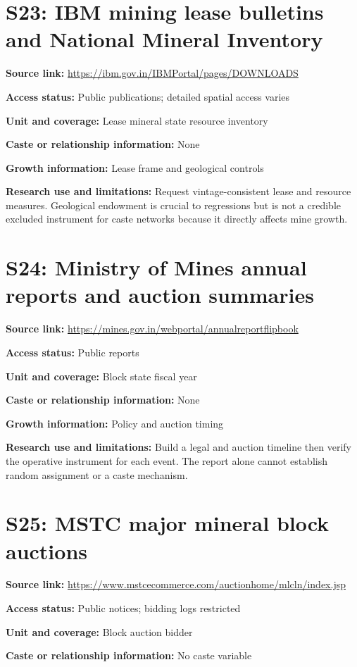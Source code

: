 \documentclass[11pt,a4paper]{report}
\begin{document}
\section{S23: IBM mining lease bulletins and National Mineral Inventory}\hypertarget{S23}{}
\textbf{Source link:} \url{https://ibm.gov.in/IBMPortal/pages/DOWNLOADS}

\textbf{Access status:} Public publications; detailed spatial access varies

\textbf{Unit and coverage:} Lease mineral state resource inventory

\textbf{Caste or relationship information:} None

\textbf{Growth information:} Lease frame and geological controls

\textbf{Research use and limitations:} Request vintage-consistent lease and resource measures. Geological endowment is crucial to regressions but is not a credible excluded instrument for caste networks because it directly affects mine growth.

\section{S24: Ministry of Mines annual reports and auction summaries}\hypertarget{S24}{}
\textbf{Source link:} \url{https://mines.gov.in/webportal/annualreportflipbook}

\textbf{Access status:} Public reports

\textbf{Unit and coverage:} Block state fiscal year

\textbf{Caste or relationship information:} None

\textbf{Growth information:} Policy and auction timing

\textbf{Research use and limitations:} Build a legal and auction timeline then verify the operative instrument for each event. The report alone cannot establish random assignment or a caste mechanism.

\section{S25: MSTC major mineral block auctions}\hypertarget{S25}{}
\textbf{Source link:} \url{https://www.mstcecommerce.com/auctionhome/mlcln/index.jsp}

\textbf{Access status:} Public notices; bidding logs restricted

\textbf{Unit and coverage:} Block auction bidder

\textbf{Caste or relationship information:} No caste variable
\end{document}
